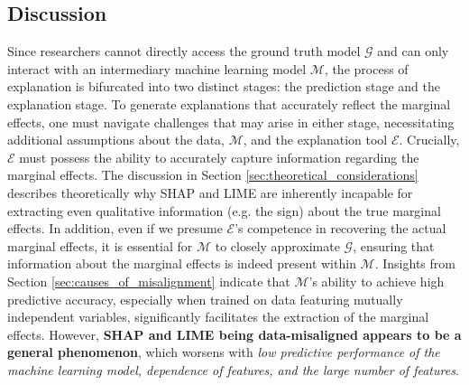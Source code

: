 \documentclass[mnsc,blindrev]{informs3}
\begin{document}
    \subsection{Discussion}
            Since researchers cannot directly access the ground truth model $\mathcal{G}$ and can only interact with an intermediary machine learning model $\mathcal{M}$, the process of explanation is bifurcated into two distinct stages: the prediction stage and the explanation stage. To generate explanations that accurately reflect the marginal effects, one must navigate challenges that may arise in either stage, necessitating additional assumptions about the data, $\mathcal{M}$, and the explanation tool $\mathcal{E}$. Crucially, $\mathcal{E}$ must possess the ability to accurately capture information regarding the marginal effects. The discussion in Section \ref{sec:theoretical_considerations} describes theoretically why  SHAP and LIME are inherently incapable for extracting even qualitative information (e.g. the sign) about the true marginal effects. In addition, even if we presume $\mathcal{E}$'s competence in recovering the actual marginal effects, it is essential for $\mathcal{M}$ to closely approximate $\mathcal{G}$, ensuring that information about the marginal effects is indeed present within $\mathcal{M}$. Insights from Section \ref{sec:causes_of_misalignment} indicate that $\mathcal{M}$'s ability to achieve high predictive accuracy, especially when trained on data featuring mutually independent variables, significantly facilitates the extraction of the marginal effects. However, \textbf{SHAP and LIME being data-misaligned appears to be a general phenomenon}, which worsens with \textit{low predictive performance of the machine learning model, dependence of features, and the large number of features}. 


\end{document}
